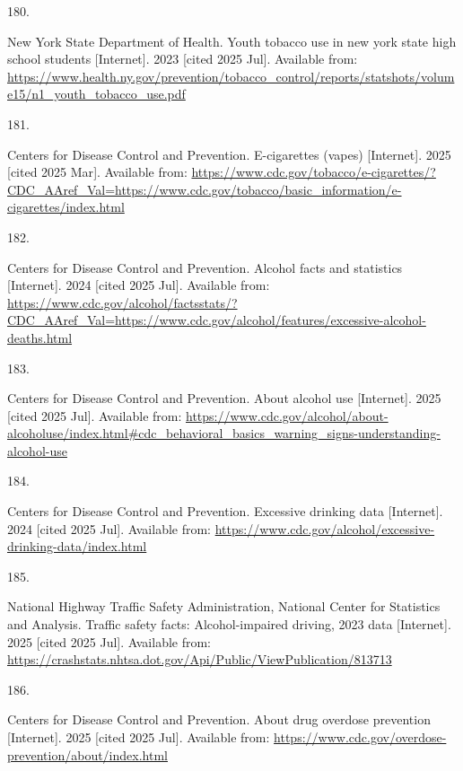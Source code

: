 \documentclass[
  english,
  letterpaper,
]{report}
\newlength{\cslhangindent}
\newlength{\csllabelwidth}
\newenvironment{CSLReferences}[2] %
 {\begin{list}{}{%
  \setlength{\itemindent}{0pt}
  \setlength{\leftmargin}{0pt}
  \setlength{\parsep}{0pt}
  \ifodd #1
   \setlength{\leftmargin}{\cslhangindent}
   \setlength{\itemindent}{-1\cslhangindent}
  \fi
  \setlength{\itemsep}{#2\baselineskip}}}
 {\end{list}}
\newcommand{\CSLLeftMargin}[1]{\parbox[t]{\csllabelwidth}{\strut#1\strut}}
\newcommand{\CSLRightInline}[1]{\parbox[t]{\linewidth - \csllabelwidth}{\strut#1\strut}}
\begin{document}
\begin{CSLReferences}{0}{1}
\CSLLeftMargin{180. }%
\CSLRightInline{New York State Department of Health. Youth tobacco use
in new york state high school students {[}Internet{]}. 2023 {[}cited
2025 Jul{]}. Available from:
\url{https://www.health.ny.gov/prevention/tobacco_control/reports/statshots/volume15/n1_youth_tobacco_use.pdf}}

\CSLLeftMargin{181. }%
\CSLRightInline{Centers for Disease Control and Prevention. E-cigarettes
(vapes) {[}Internet{]}. 2025 {[}cited 2025 Mar{]}. Available from:
\url{https://www.cdc.gov/tobacco/e-cigarettes/?CDC_AAref_Val=https://www.cdc.gov/tobacco/basic_information/e-cigarettes/index.html}}

\CSLLeftMargin{182. }%
\CSLRightInline{Centers for Disease Control and Prevention. Alcohol
facts and statistics {[}Internet{]}. 2024 {[}cited 2025 Jul{]}.
Available from:
\url{https://www.cdc.gov/alcohol/factsstats/?CDC_AAref_Val=https://www.cdc.gov/alcohol/features/excessive-alcohol-deaths.html}}

\CSLLeftMargin{183. }%
\CSLRightInline{Centers for Disease Control and Prevention. About
alcohol use {[}Internet{]}. 2025 {[}cited 2025 Jul{]}. Available from:
\url{https://www.cdc.gov/alcohol/about-alcoholuse/index.html\#cdc_behavioral_basics_warning_signs-understanding-alcohol-use}}

\CSLLeftMargin{184. }%
\CSLRightInline{Centers for Disease Control and Prevention. Excessive
drinking data {[}Internet{]}. 2024 {[}cited 2025 Jul{]}. Available from:
\url{https://www.cdc.gov/alcohol/excessive-drinking-data/index.html}}

\CSLLeftMargin{185. }%
\CSLRightInline{National Highway Traffic Safety Administration, National
Center for Statistics and Analysis. Traffic safety facts:
Alcohol-impaired driving, 2023 data {[}Internet{]}. 2025 {[}cited 2025
Jul{]}. Available from:
\url{https://crashstats.nhtsa.dot.gov/Api/Public/ViewPublication/813713}}

\CSLLeftMargin{186. }%
\CSLRightInline{Centers for Disease Control and Prevention. About drug
overdose prevention {[}Internet{]}. 2025 {[}cited 2025 Jul{]}. Available
from: \url{https://www.cdc.gov/overdose-prevention/about/index.html}}


\end{CSLReferences}
\end{document}
